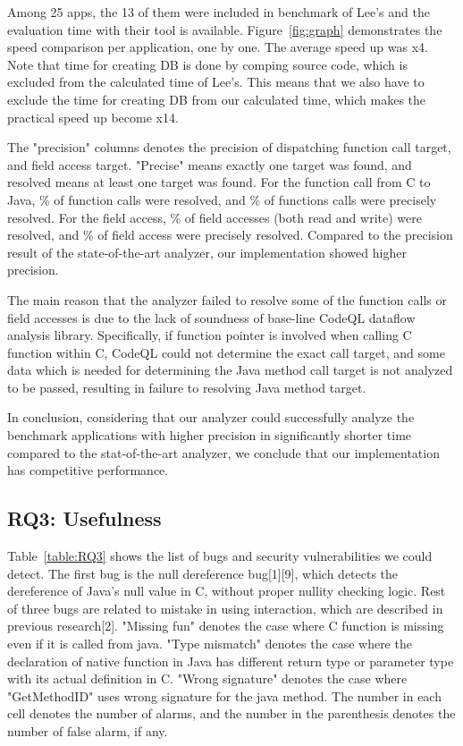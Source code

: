 Among 25 apps, the 13 of them were included in benchmark of Lee's and the
evaluation time with their tool is available.  Figure~\ref{fig:graph}
demonstrates the speed comparison per application, one by one.  The average
speed up was x4. Note that time for creating DB is done by comping source code,
which is excluded from the calculated time of Lee's. This means that we also
have to exclude the time for creating DB from our calculated time, which makes
the practical speed up become x14.

The "precision" columns denotes the precision of dispatching function call
target, and field access target.  "Precise" means exactly one target was found,
and resolved means at least one target was found. For the function call from C to Java,
\% of function calls were resolved, and \% of functions calls
were precisely resolved. For the field access, \% of field accesses (both
read and write) were resolved, and \% of field access were precisely resolved.
Compared to the precision result of the state-of-the-art analyzer, our implementation
showed higher precision.

The main reason that the analyzer failed to resolve some of the function calls
or field accesses is due to the lack of soundness of base-line CodeQL dataflow
analysis library.  Specifically, if function pointer is involved when calling C
function within C, CodeQL could not determine the exact call target, and some
data which is needed for determining the Java method call target is not
analyzed to be passed, resulting in failure to resolving Java method target.

In conclusion, considering that our analyzer could successfully analyze the
benchmark applications with higher precision in significantly shorter time
compared to the stat-of-the-art analyzer, we conclude that our implementation
has competitive performance.

\subsection{RQ3: Usefulness}

Table~\ref{table:RQ3} shows the list of bugs and security vulnerabilities we could detect.
The first bug is the null dereference bug[1][9], which detects the dereference of
Java's null value in C, without proper nullity checking logic. Rest of three
bugs are related to mistake in using interaction, which are described in
previous research[2]. "Missing fun" denotes the case where C function is
missing even if it is called from java. "Type mismatch" denotes the case where
the declaration of native function in Java has different return type or
parameter type with its actual definition in C.  "Wrong signature" denotes the
case where "GetMethodID" uses wrong signature for the java method. The
number in each cell denotes the number of alarms, and the number in the
parenthesis denotes the number of false alarm, if any.

